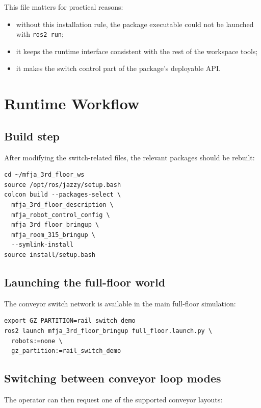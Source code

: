 \documentclass[11pt,a4paper]{article}
\begin{document}


This file matters for practical reasons:
\begin{itemize}
\item without this installation rule, the package executable  could not be launched with \texttt{ros2 run};
\item it keeps the runtime interface consistent with the rest of the workspace tools;
\item it makes the switch control part of the package's deployable API.
\end{itemize}

\section{Runtime Workflow}
\subsection{Build step}
After modifying the switch-related files, the relevant packages should be rebuilt:

\begin{lstlisting}[style=reportcode,caption={Typical rebuild command for the switch-related packages.}]
cd ~/mfja_3rd_floor_ws
source /opt/ros/jazzy/setup.bash
colcon build --packages-select \
  mfja_3rd_floor_description \
  mfja_robot_control_config \
  mfja_3rd_floor_bringup \
  mfja_room_315_bringup \
  --symlink-install
source install/setup.bash
\end{lstlisting}

\subsection{Launching the full-floor world}
The conveyor switch network is available in the main full-floor simulation:

\begin{lstlisting}[style=reportcode,caption={Example launch command for the full-floor world.}]
export GZ_PARTITION=rail_switch_demo
ros2 launch mfja_3rd_floor_bringup full_floor.launch.py \
  robots:=none \
  gz_partition:=rail_switch_demo
\end{lstlisting}

\subsection{Switching between conveyor loop modes}
The operator can then request one of the supported conveyor layouts:
\end{document}
